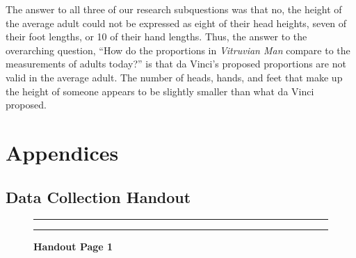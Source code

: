 \documentclass[]{article}
\begin{document}
The answer to all three of our research subquestions was that no, the
height of the average adult could not be expressed as eight of their
head heights, seven of their foot lengths, or 10 of their hand lengths.
Thus, the answer to the overarching question, ``How do the proportions
in \emph{Vitruvian Man} compare to the measurements of adults today?''
is that da Vinci's proposed proportions are not valid in the average
adult. The number of heads, hands, and feet that make up the height of
someone appears to be slightly smaller than what da Vinci proposed.

\newpage

\section{Appendices}
\label{sec:appendix}

\subsection{Data Collection Handout}
\label{sec:appendix-data-handout}

\begin{figure}[!ht]
    \hrule
    \caption{ \textbf{Handout Page 1} }
    \begin{center}
    \end{center}
    \label{fig:handout-1}
    \hrule
\end{figure}
\end{document}
